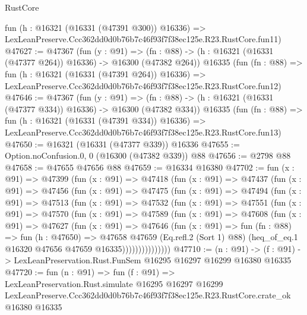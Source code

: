 \begin{lexlean}{RustCore}
\begin{coremodule}
    fun (h : @16321 (@16331 (@47391 @300)) @16336) =>
    LexLeanPreserve.Ccc362dd0d0b76b7c46f93f7f38ec125e.R23.RustCore.fun11)
@47627 := @47367
    (fun (y : @91) =>
    (fn : @88) -> (h : @16321 (@16331 (@47377 @264)) @16336) -> @16300 (@47382 @264))
    @16335
    (fun (fn : @88) =>
    fun (h : @16321 (@16331 (@47391 @264)) @16336) =>
    LexLeanPreserve.Ccc362dd0d0b76b7c46f93f7f38ec125e.R23.RustCore.fun12)
@47646 := @47367
    (fun (y : @91) =>
    (fn : @88) -> (h : @16321 (@16331 (@47377 @334)) @16336) -> @16300 (@47382 @334))
    @16335
    (fun (fn : @88) =>
    fun (h : @16321 (@16331 (@47391 @334)) @16336) =>
    LexLeanPreserve.Ccc362dd0d0b76b7c46f93f7f38ec125e.R23.RustCore.fun13)
@47650 := @16321 (@16331 (@47377 @339)) @16336
@47655 := Option.noConfusion.{0, 0} (@16300 (@47382 @339)) @88
@47656 := @2798 @88
@47658 := @47655 @47656 @88
@47659 := @16334 @16380
@47702 := fun (x : @91) =>
  @47399
    (fun (x : @91) =>
    @47418
      (fun (x : @91) =>
      @47437
        (fun (x : @91) =>
        @47456
          (fun (x : @91) =>
          @47475
            (fun (x : @91) =>
            @47494
              (fun (x : @91) =>
              @47513
                (fun (x : @91) =>
                @47532
                  (fun (x : @91) =>
                  @47551
                    (fun (x : @91) =>
                    @47570
                      (fun (x : @91) =>
                      @47589
                        (fun (x : @91) =>
                        @47608
                          (fun (x : @91) =>
                          @47627
                            (fun (x : @91) =>
                            @47646
                              (fun (x : @91) =>
                              fun (fn : @88) =>
                              fun (h : @47650) =>
                              @47658
                                @47659
                                (Eq.refl.{2} (Sort 1) @88)
                                (heq_of_eq.{1} @16320 @47656 @47659 @16335)))))))))))))))
@47710 := (n : @91) ->
  (f : @91) -> LexLeanPreservation.Rust.FunSem @16295 @16297 @16299 @16380 @16335
@47720 := fun (n : @91) =>
  fun (f : @91) =>
  LexLeanPreservation.Rust.simulate
    @16295
    @16297
    @16299
    LexLeanPreserve.Ccc362dd0d0b76b7c46f93f7f38ec125e.R23.RustCore.crate_ok
    @16380
    @16335
\end{coremodule}
\end{lexlean}
